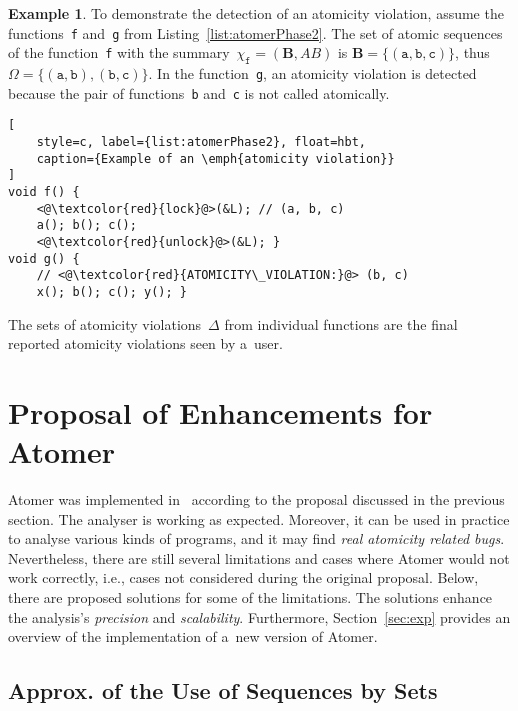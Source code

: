 \documentclass{ExcelAtFIT}
\theoremstyle{definition}
\newtheorem{example}{Example}[section]
\begin{document}
\begin{example}
    \sloppy
    To demonstrate the detection of an atomicity violation, assume the functions~\texttt{f} and~\texttt{g} from Listing~\ref{list:atomerPhase2}. The set of atomic sequences of the function~\texttt{f} with the summary~$ \chi_\mathtt{f} = (\boldsymbol{B}, AB) $ is $ \boldsymbol{B} = \{(\mathtt{a, b, c})\} $, thus $ \Omega = \{{(\mathtt{a, b})}, {(\mathtt{b, c})}\} $. In the function~\texttt{g}, an atomicity violation is detected because the pair of functions~\texttt{b} and~\texttt{c} is not called atomically.
\end{example}

\begin{lstlisting}[
    style=c, label={list:atomerPhase2}, float=hbt,
    caption={Example of an \emph{atomicity violation}}
]
void f() {
    <@\textcolor{red}{lock}@>(&L); // (a, b, c)
    a(); b(); c();
    <@\textcolor{red}{unlock}@>(&L); }
void g() {
    // <@\textcolor{red}{ATOMICITY\_VIOLATION:}@> (b, c)
    x(); b(); c(); y(); }
\end{lstlisting}

The sets of atomicity violations~$ \Delta $ from individual functions are the final reported atomicity violations seen by a~user.


\section{\hspace{-.15em}Proposal of Enhancements for Atomer}
\label{sec:proposal}

Atomer was implemented in~\cite{harmimBP} according to the proposal discussed in the previous section. The analyser is working as expected. Moreover, it can be used in practice to analyse various kinds of programs, and it may find \emph{real atomicity related bugs}. Nevertheless, there are still several limitations and cases where Atomer would not work correctly, i.e., cases not considered during the original proposal. Below, there are proposed solutions for some of the limitations. The solutions enhance the analysis's \emph{precision} and \emph{scalability}. Furthermore, Section~\ref{sec:exp} provides an overview of the implementation of a~new version of Atomer.

\subsection{Approx. of the Use of Sequences by Sets}
\end{document}
